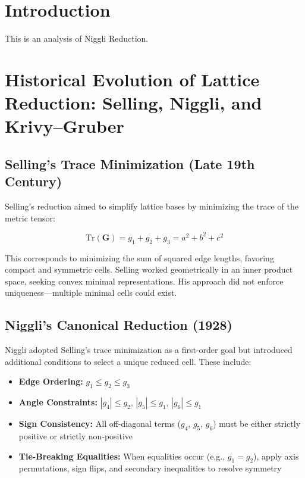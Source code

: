 \documentclass[preprint]{iucr}              %
\begin{document}

\section{Introduction}
This is an analysis of Niggli Reduction.

\section*{Historical Evolution of Lattice Reduction: Selling, Niggli, and Krivy--Gruber}

\subsection*{Selling's Trace Minimization (Late 19th Century)}

Selling's reduction aimed to simplify lattice bases by minimizing the trace of the metric tensor:



\[
\mathrm{Tr}(\mathbf{G}) = g_1 + g_2 + g_3 = a^2 + b^2 + c^2
\]



This corresponds to minimizing the sum of squared edge lengths, favoring compact and symmetric cells. Selling worked geometrically in an inner product space, seeking convex minimal representations. His approach did not enforce uniqueness—multiple minimal cells could exist.

\subsection*{Niggli's Canonical Reduction (1928)}

Niggli adopted Selling's trace minimization as a first-order goal but introduced additional conditions to select a unique reduced cell. These include:

\begin{itemize}
	\item \textbf{Edge Ordering:} $g_1 \leq g_2 \leq g_3$
	\item \textbf{Angle Constraints:} $|g_4| \leq g_2$, $|g_5| \leq g_1$, $|g_6| \leq g_1$
	\item \textbf{Sign Consistency:} All off-diagonal terms ($g_4$, $g_5$, $g_6$) must be either strictly positive or strictly non-positive
	\item \textbf{Tie-Breaking Equalities:} When equalities occur (e.g., $g_1 = g_2$), apply axis permutations, sign flips, and secondary inequalities to resolve symmetry
\end{itemize}
\end{document}
